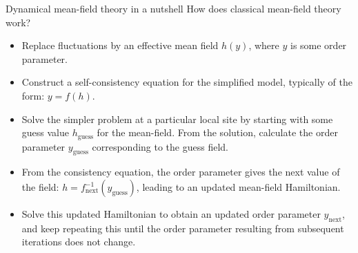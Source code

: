 \documentclass[9pt,aspectratio=169]{beamer}
\begin{document}
\begin{frame}{Dynamical mean-field theory in a nutshell}
	\alert{How does classical mean-field theory work?}
\begin{itemize}[<+->]
	\item Replace fluctuations by an \alert{effective mean field} $h(y)$, where \(y\) is some order parameter.
		\\[10pt]
\item Construct a \alert{self-consistency equation} for the simplified model, typically of the form: $y = f(h)$.
	\\[10pt]
\item Solve the simpler problem at a particular local site by starting with some \alert{guess value \(h_\text{guess}\) for the mean-field}. From the solution, calculate the order parameter \(y_\text{guess}\) corresponding to the guess field.
	\\[10pt]
\item From the consistency equation, the order parameter gives the next value of the field: \(h = f^{-1}_\text{next}(y_\text{guess})\), leading to an \alert{updated mean-field Hamiltonian}.
	\\[10pt]
\item Solve this updated Hamiltonian to obtain an updated order parameter $y_\text{next}$, and \alert{keep repeating} this until the order parameter resulting from subsequent iterations does not change.
\end{itemize}
	
\end{frame}
\end{document}
